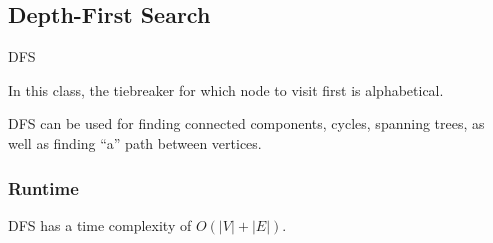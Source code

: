 \subsection{Depth-First Search}

\begin{algorithm}
	\caption{DFS}
\end{algorithm}

\begin{note}
	In this class, the tiebreaker for which node to visit first is alphabetical.
\end{note}

DFS can be used for finding connected components, cycles, spanning trees, as well as finding ``a'' path between vertices.

\subsubsection{Runtime}

DFS has a time complexity of \( O(|V|+|E|) \).

